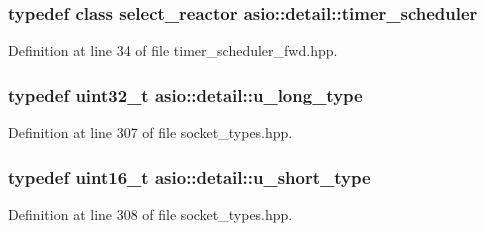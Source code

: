 \hypertarget{namespaceasio_1_1detail_abb0125752bc593c76015c71b57395b15}{}
\subsubsection[{timer\+\_\+scheduler}]{\setlength{\rightskip}{0pt plus 5cm}typedef class {\bf select\+\_\+reactor} {\bf asio\+::detail\+::timer\+\_\+scheduler}}\label{namespaceasio_1_1detail_abb0125752bc593c76015c71b57395b15}


Definition at line 34 of file timer\+\_\+scheduler\+\_\+fwd.\+hpp.

\hypertarget{namespaceasio_1_1detail_a875fc877056700355cc63b79b29687bc}{}
\subsubsection[{u\+\_\+long\+\_\+type}]{\setlength{\rightskip}{0pt plus 5cm}typedef uint32\+\_\+t {\bf asio\+::detail\+::u\+\_\+long\+\_\+type}}\label{namespaceasio_1_1detail_a875fc877056700355cc63b79b29687bc}


Definition at line 307 of file socket\+\_\+types.\+hpp.

\hypertarget{namespaceasio_1_1detail_a06a0b3d4e1daccdccf9ebc949c7d29c0}{}
\subsubsection[{u\+\_\+short\+\_\+type}]{\setlength{\rightskip}{0pt plus 5cm}typedef uint16\+\_\+t {\bf asio\+::detail\+::u\+\_\+short\+\_\+type}}\label{namespaceasio_1_1detail_a06a0b3d4e1daccdccf9ebc949c7d29c0}


Definition at line 308 of file socket\+\_\+types.\+hpp.



